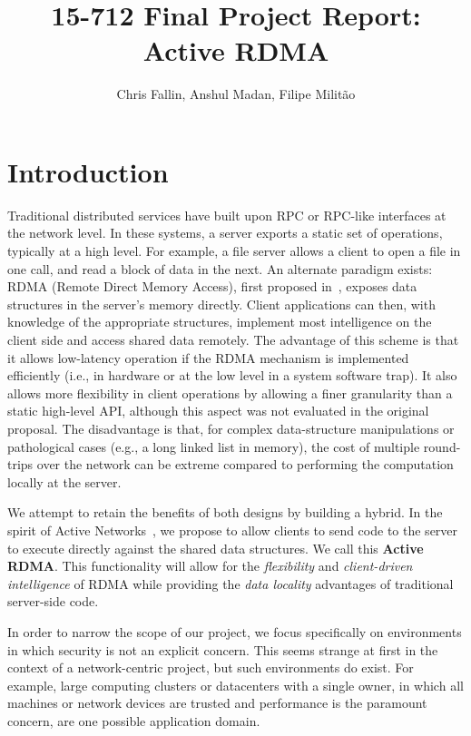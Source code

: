 \documentclass[10pt]{article}
\title{15-712 Final Project Report: Active RDMA}
\author{Chris Fallin, Anshul Madan, Filipe Milit\~{a}o}
\date{}
\begin{document}
\maketitle

\section{Introduction}

Traditional distributed services have built upon RPC or RPC-like
interfaces at the network level. In these systems, a server exports a
static set of operations, typically at a high level. For example, a
file server allows a client to open a file in one call, and read a
block of data in the next. An alternate paradigm exists: RDMA (Remote
Direct Memory Access), first proposed in~\cite{thekkath94}, exposes
data structures in the server's memory directly. Client applications
can then, with knowledge of the appropriate structures, implement most
intelligence on the client side and access shared data remotely. The
advantage of this scheme is that it allows low-latency operation if
the RDMA mechanism is implemented efficiently (i.e., in hardware or at
the low level in a system software trap). It also allows more
flexibility in client operations by allowing a finer granularity than
a static high-level API, although this aspect was not evaluated in the
original proposal. The disadvantage is that, for complex
data-structure manipulations or pathological cases (e.g., a long
linked list in memory), the cost of multiple round-trips over the
network can be extreme compared to performing the computation locally
at the server.

We attempt to retain the benefits of both designs by building a
hybrid. In the spirit of Active Networks~\cite{AN-survey}, we propose
to allow clients to send code to the server to execute directly
against the shared data structures. We call this \textbf{Active
  RDMA}. This functionality will allow for the \emph{flexibility} and
\emph{client-driven intelligence} of RDMA while providing the
\emph{data locality} advantages of traditional server-side code.

In order to narrow the scope of our project, we focus specifically on
environments in which security is not an explicit concern. This seems
strange at first in the context of a network-centric project, but
such environments do exist. For example, large computing clusters or
datacenters with a single owner, in which all machines or network
devices are trusted and performance is the paramount concern, are one
possible application domain.
\end{document}
